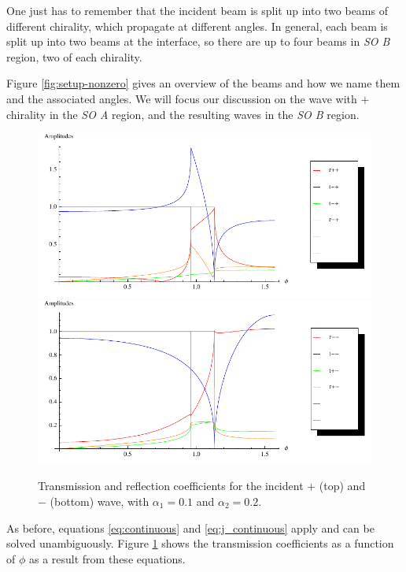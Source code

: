 One just has to remember that the incident beam is split up
into two beams of different chirality, which propagate at different
angles. In general, each beam is split up into two beams at the
interface, so there are up to four beams in \emph{SO B} region,
two of each chirality.

Figure \ref{fig:setup-nonzero} gives an overview of the beams and how
we name them and the associated angles. We will focus our discussion
on the wave with $+$ chirality in the \emph{SO A} region, and the
resulting waves in the \emph{SO B} region.

\begin{figure}
    \begin{center}
        \includegraphics[width=\textwidth]{nonzero-plus.pdf}
        \includegraphics[width=\textwidth]{nonzero-minus.pdf}
    \end{center}
    \caption{Transmission and reflection coefficients for the
        incident $+$ (top) and $-$ (bottom) wave, with
        $\alpha_1 = 0.1$ and $\alpha_2 = 0.2$.}
    \label{fig:plots-nonzero}
\end{figure}

As before, equations \ref{eq:continuous} and \ref{eq:j_continuous}
apply and can be solved unambiguously. Figure \ref{fig:plots-nonzero}
shows the transmission coefficients as a function of $\phi$ as a
result from these equations.


